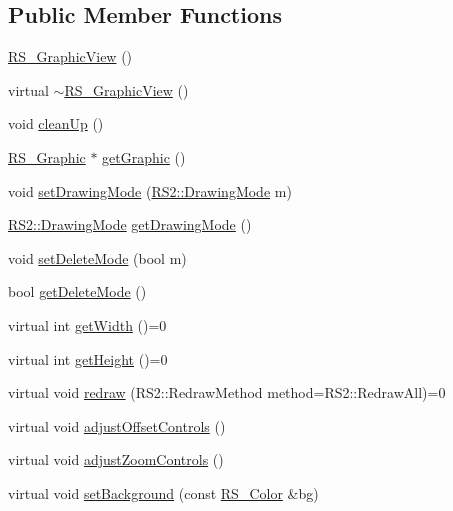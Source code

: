 \subsection*{Public Member Functions}
\begin{DoxyCompactItemize}
\item 
\hyperlink{classRS__GraphicView_a04d05a8525c1a2e66e2feb7ddbeed944}{R\-S\-\_\-\-Graphic\-View} ()
\item 
virtual \hyperlink{classRS__GraphicView_aaf1ec577df37cfcf7c785a7ffbef2e21}{$\sim$\-R\-S\-\_\-\-Graphic\-View} ()
\item 
void \hyperlink{classRS__GraphicView_a09377d39a5f76790ef640f0c03664c44}{clean\-Up} ()
\item 
\hyperlink{classRS__Graphic}{R\-S\-\_\-\-Graphic} $\ast$ \hyperlink{classRS__GraphicView_ac4a2671eca4f7f6ca215c891bc04f17c}{get\-Graphic} ()
\item 
void \hyperlink{classRS__GraphicView_a94e8aa56a10fe55892e84855e849326f}{set\-Drawing\-Mode} (\hyperlink{classRS2_a67196f135592d0f8eff894bd126685b2}{R\-S2\-::\-Drawing\-Mode} m)
\item 
\hyperlink{classRS2_a67196f135592d0f8eff894bd126685b2}{R\-S2\-::\-Drawing\-Mode} \hyperlink{classRS__GraphicView_adaf7968fe59f2f435e4dddd88c25114d}{get\-Drawing\-Mode} ()
\item 
void \hyperlink{classRS__GraphicView_a674734e6889123a0aa1822cf4f3ac195}{set\-Delete\-Mode} (bool m)
\item 
bool \hyperlink{classRS__GraphicView_a7c412fcd99f4bc962a38774285e1ec6a}{get\-Delete\-Mode} ()
\item 
virtual int \hyperlink{classRS__GraphicView_a99858a9507de483858071fd209a53e89}{get\-Width} ()=0
\item 
virtual int \hyperlink{classRS__GraphicView_af354fd031dfc0c8e6d8bfb83f415bea5}{get\-Height} ()=0
\item 
virtual void \hyperlink{classRS__GraphicView_a5ea54ec2dfcc2bb1553dfa867986fe31}{redraw} (R\-S2\-::\-Redraw\-Method method=R\-S2\-::\-Redraw\-All)=0
\item 
virtual void \hyperlink{classRS__GraphicView_a87478365dda45fc26c349874d9b92ca0}{adjust\-Offset\-Controls} ()
\item 
virtual void \hyperlink{classRS__GraphicView_aa26f3d00ce72bde330808acd064737ea}{adjust\-Zoom\-Controls} ()
\item 
virtual void \hyperlink{classRS__GraphicView_a05efd0c10a77534f6fb8ef228ba9c23b}{set\-Background} (const \hyperlink{classRS__Color}{R\-S\-\_\-\-Color} \&bg)

\end{DoxyCompactItemize}
